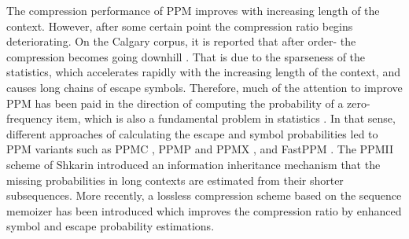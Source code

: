 \documentclass[runningheads,a4paper]{llncs}
\begin{document}
The compression performance of PPM improves with increasing length of the context. 
However, after some certain point the compression ratio begins deteriorating. 
On the Calgary corpus, it is reported that after order- the compression becomes going downhill \cite{Sal04}. 
That is due to the sparseness of the statistics, which accelerates rapidly with the increasing length of the context, 
 and causes long chains of escape symbols. 
Therefore, much of the attention to improve PPM has been paid in the direction of computing the probability of a 
zero-frequency item, which is also a fundamental problem in statistics \cite{WB91,CT95,wood2011}. 
In that sense, different approaches of calculating the escape and symbol probabilities led to PPM variants such as PPMC
\cite{Moffat90}, PPMP and PPMX \cite{WB91}, and FastPPM \cite{HV94}. The PPMII \cite{shkarin2001,shkarin2002ppm} scheme
of Shkarin introduced an information inheritance mechanism  that the missing probabilities in long contexts are 
estimated from their shorter subsequences. 
More recently,  a lossless compression scheme based on the sequence memoizer \cite{gasthaus2010} has been introduced
which improves the compression ratio by enhanced symbol and escape probability estimations.
\end{document}
